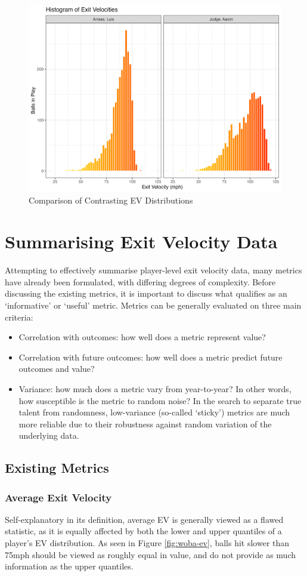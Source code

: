 \documentclass[12pt, TexShade, letterpaper]{report}
\begin{document}
\begin{figure}
    \centering
    \includegraphics[width=0.8\linewidth]{plots/playerComparison.png}
    \caption{Comparison of Contrasting EV Distributions}
    \label{fig:player-comp}
\end{figure}

\section{Summarising Exit Velocity Data}\label{metrics}
Attempting to effectively summarise player-level exit velocity data, many metrics have already been formulated, with differing degrees of complexity. Before discussing the existing metrics, it is important to discuss what qualifies as an `informative' or `useful' metric. Metrics can be generally evaluated on three main criteria:
\begin{itemize}
    \item Correlation with outcomes: how well does a metric represent value?
    \item Correlation with future outcomes: how well does a metric predict future outcomes and value?
    \item Variance: how much does a metric vary from year-to-year? In other words, how susceptible is the metric to random noise? In the search to separate true talent from randomness, low-variance (so-called `sticky') metrics are much more reliable due to their robustness against random variation of the underlying data.
\end{itemize}

\subsection{Existing Metrics}
\subsubsection{Average Exit Velocity}
Self-explanatory in its definition, average EV is generally viewed as a flawed statistic, as it is equally affected by both the lower and upper quantiles of a player's EV distribution. As seen in Figure \ref{fig:woba-ev}, balls hit slower than 75mph should be viewed as roughly equal in value, and do not provide as much information as the upper quantiles.
\end{document}

